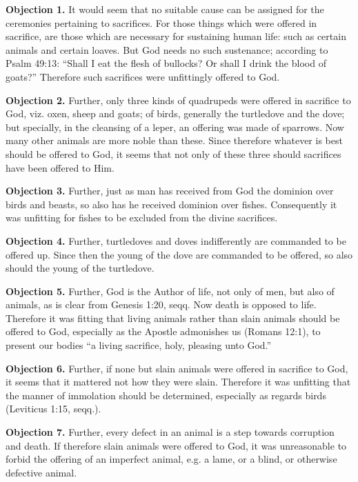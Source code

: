 
\textbf{Objection 1.} It would seem that no suitable cause can be assigned for the ceremonies pertaining to sacrifices. For those things which were offered in sacrifice, are those which are necessary for sustaining human life: such as certain animals and certain loaves. But God needs no such sustenance; according to Psalm 49:13: ``Shall I eat the flesh of bullocks? Or shall I drink the blood of goats?'' Therefore such sacrifices were unfittingly offered to God.

\textbf{Objection 2.} Further, only three kinds of quadrupeds were offered in sacrifice to God, viz. oxen, sheep and goats; of birds, generally the turtledove and the dove; but specially, in the cleansing of a leper, an offering was made of sparrows. Now many other animals are more noble than these. Since therefore whatever is best should be offered to God, it seems that not only of these three should sacrifices have been offered to Him.

\textbf{Objection 3.} Further, just as man has received from God the dominion over birds and beasts, so also has he received dominion over fishes. Consequently it was unfitting for fishes to be excluded from the divine sacrifices.

\textbf{Objection 4.} Further, turtledoves and doves indifferently are commanded to be offered up. Since then the young of the dove are commanded to be offered, so also should the young of the turtledove.

\textbf{Objection 5.} Further, God is the Author of life, not only of men, but also of animals, as is clear from Genesis 1:20, seqq. Now death is opposed to life. Therefore it was fitting that living animals rather than slain animals should be offered to God, especially as the Apostle admonishes us (Romans 12:1), to present our bodies ``a living sacrifice, holy, pleasing unto God.''

\textbf{Objection 6.} Further, if none but slain animals were offered in sacrifice to God, it seems that it mattered not how they were slain. Therefore it was unfitting that the manner of immolation should be determined, especially as regards birds (Leviticus 1:15, seqq.).

\textbf{Objection 7.} Further, every defect in an animal is a step towards corruption and death. If therefore slain animals were offered to God, it was unreasonable to forbid the offering of an imperfect animal, e.g. a lame, or a blind, or otherwise defective animal.

